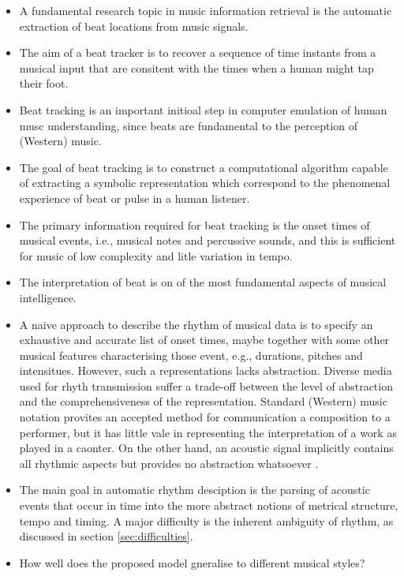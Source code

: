 \documentclass{scrartcl}
\begin{document}
\begin{itemize}
\item A fundamental research topic in music information retrieval is the automatic extraction of beat locations from music signals. 
\item The aim of a beat tracker is to recover a sequence of time instants from a musical input that are consitent with the times when a human might tap their foot. \cite{Ellis2007}
\item Beat tracking is an important initioal step in computer emulation of human musc understanding, since beats are fundamental to the perception of (Western) music.
\item The goal of beat tracking is to construct a computational algorithm capable of extracting a symbolic representation which correspond to the phenomenal experience of beat or pulse in a human listener.
\item The primary information required for beat tracking is the onset times of musical events, i.e., musical notes and percussive sounds, and this is sufficient for music of low complexity and litle variation in tempo.
\item The interpretation of beat is on of the most fundamental aspects of musical intelligence.
\item A naive approach to describe the rhythm of musical data is to specify an exhaustive and accurate list of onset times, maybe together with some other musical features characterising those event, e.g., durations, pitches and intensitues. However, such a representations lacks abstraction. Diverse media used for rhyth transmission suffer a trade-off between the level of abstraction and the comprehensiveness of the representation. Standard (Western) music notation provites an accepted method for communication a composition to a performer, but it has little vale in representing the interpretation of a work as played in a caonter. On the other hand, an acoustic signal implicitly contains all rhythmic aspects but provides no abstraction whatsoever \cite{Gouyon2005}.
\item The main goal in automatic rhythm desciption is the parsing of acoustic events that occur in time into the more abstract notions of metrical structure, tempo and timing. A major difficulty is the inherent ambiguity of rhythm, as discussed in section \ref{sec:difficulties}.
\item How well does the proposed model gneralise to different musical styles?
\end{itemize}
\end{document}
